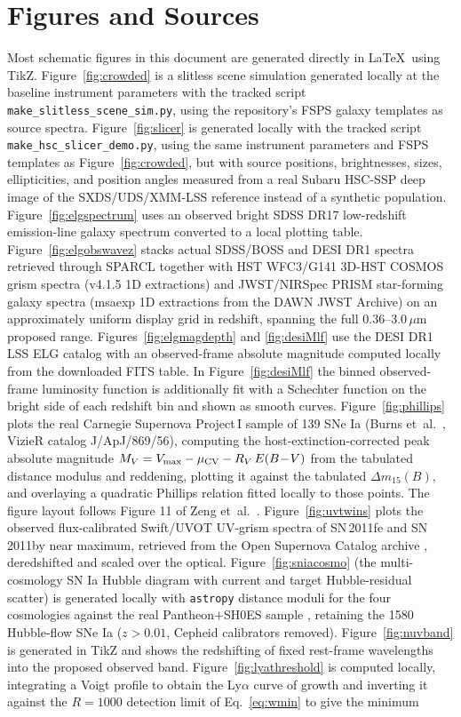 \section*{Figures and Sources}
Most schematic figures in this document are generated directly in \LaTeX\ using TikZ. Figure~\ref{fig:crowded} is a slitless scene simulation generated locally at the baseline instrument parameters with the tracked script \texttt{make\_slitless\_scene\_sim.py}, using the repository's FSPS galaxy templates as source spectra. Figure~\ref{fig:slicer} is generated locally with the tracked script \texttt{make\_hsc\_slicer\_demo.py}, using the same instrument parameters and FSPS templates as Figure~\ref{fig:crowded}, but with source positions, brightnesses, sizes, ellipticities, and position angles measured from a real Subaru HSC-SSP deep image of the SXDS/UDS/XMM-LSS reference \cite{aihara2018} instead of a synthetic population. Figure~\ref{fig:elgspectrum} uses an observed bright SDSS DR17 low-redshift emission-line galaxy spectrum converted to a local plotting table. Figure~\ref{fig:elgobswavez} stacks actual SDSS/BOSS and DESI DR1 spectra retrieved through SPARCL together with HST WFC3/G141 3D-HST COSMOS grism spectra (v4.1.5 1D extractions) and JWST/NIRSpec PRISM star-forming galaxy spectra (msaexp 1D extractions from the DAWN JWST Archive) on an approximately uniform display grid in redshift, spanning the full $0.36$--$3.0\,\mu$m proposed range. Figures~\ref{fig:elgmagdepth} and \ref{fig:desiMlf} use the DESI DR1 LSS ELG catalog with an observed-frame absolute magnitude computed locally from the downloaded FITS table. In Figure~\ref{fig:desiMlf} the binned observed-frame luminosity function is additionally fit with a Schechter function on the bright side of each redshift bin and shown as smooth curves. Figure~\ref{fig:phillips} plots the real Carnegie Supernova Project\,I sample of 139 SNe Ia (Burns et~al.\ \cite{burns2018csp}, VizieR catalog J/ApJ/869/56), computing the host-extinction-corrected peak absolute magnitude $M_V=V_{\max}-\mu_{\rm CV}-R_V\,E(B\!-\!V)$ from the tabulated distance modulus and reddening, plotting it against the tabulated $\Delta m_{15}(B)$, and overlaying a quadratic Phillips relation fitted locally to those points. The figure layout follows Figure 11 of Zeng et~al.\ \cite{zeng2025sn2023ehl}. Figure~\ref{fig:uvtwins} plots the observed flux-calibrated Swift/UVOT UV-grism spectra of SN\,2011fe and SN\,2011by near maximum, retrieved from the Open Supernova Catalog archive \cite{guillochon2017}, deredshifted and scaled over the optical. Figure~\ref{fig:sniacosmo} (the multi-cosmology SN Ia Hubble diagram with current and target Hubble-residual scatter) is generated locally with \texttt{astropy} distance moduli for the four cosmologies against the real Pantheon$+$SH0ES sample \cite{brout2022}, retaining the 1580 Hubble-flow SNe Ia ($z>0.01$, Cepheid calibrators removed). Figure~\ref{fig:nuvband} is generated in TikZ and shows the redshifting of fixed rest-frame wavelengths into the proposed observed band. Figure~\ref{fig:lyathreshold} is computed locally, integrating a Voigt profile to obtain the Ly$\alpha$ curve of growth and inverting it against the $R=1000$ detection limit of Eq.~\eqref{eq:wmin} to give the minimum 